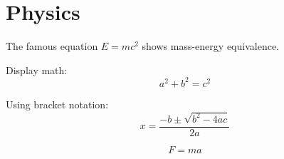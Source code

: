 \documentclass{article}
\begin{document}
\section{Physics}
The famous equation $E = mc^2$ shows mass-energy equivalence.

Display math:
$$a^2 + b^2 = c^2$$

Using bracket notation:
\[x = \frac{-b \pm \sqrt{b^2 - 4ac}}{2a}\]

\begin{equation}
F = ma
\end{equation}
\end{document}
